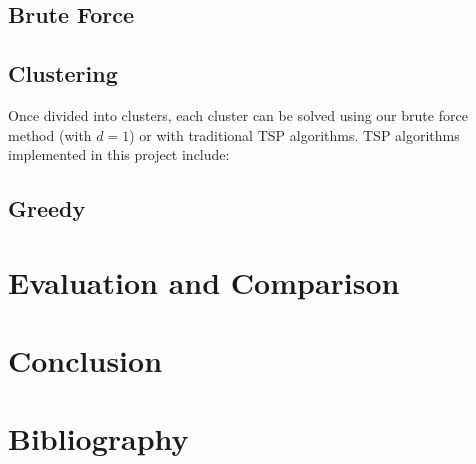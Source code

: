 \documentclass[a4paper,12pt]{article}
\begin{document}
    \subsection{Brute Force}\label{subsec:brute-force}

    \subsection{Clustering}\label{subsec:clustering}
    Once divided into clusters, each cluster can be solved using our brute force method (with \(d = 1\)) or with
    traditional TSP algorithms.
    TSP algorithms implemented in this project include:
    \subsection{Greedy}\label{subsec:greedy}

    \pagebreak

    \section{Evaluation and Comparison}\label{sec:evaluation-and-comparison}

    \pagebreak

    \section{Conclusion}\label{sec:conclusion}

    \pagebreak

    \section{Bibliography}\label{sec:bibliography}
\end{document}
